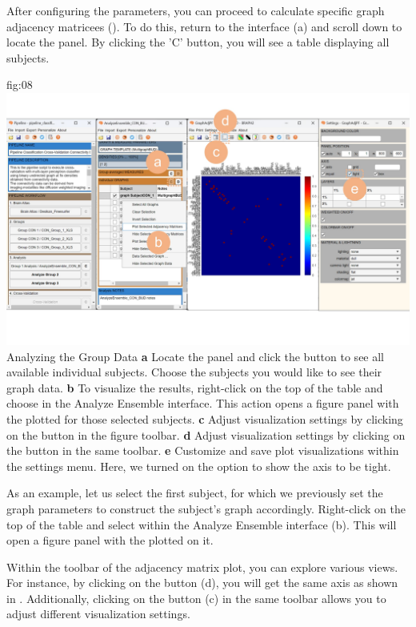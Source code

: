 \documentclass[justified]{tufte-handout}
\begin{document}
{After configuring the parameters, you can proceed to calculate specific graph adjacency matricees (). To do this, return to the  interface (a) and scroll down to locate the  panel. By clicking the 'C' button, you will see a table displaying all subjects.


	{fig:08}
	{
	\includegraphics{fig08.jpg}
	}
	{Analyzing the Group Data}
	{
	{\bf a} Locate the  panel and click the  button to see all available individual subjects. Choose the subjects you would like to see their graph data.
	{\bf b} To visualize the results, right-click on the top of the table and choose  in the Analyze Ensemble interface. This action opens a figure panel with the  plotted for those selected subjects.
	{\bf c} Adjust visualization settings by clicking on the  button in the figure toolbar.
	{\bf d} Adjust visualization settings by clicking on the  button in the same toolbar.
	{\bf e} Customize and save plot visualizations within the settings menu. Here, we turned on the option to show the axis to be tight.
	}

As an example, let us select the first subject, for which we previously set the graph parameters to construct the subject's graph accordingly. 
Right-click on the top of the table and select  within the Analyze Ensemble interface (b). This will open a figure panel with the  plotted on it.

Within the toolbar of the adjacency matrix plot, you can explore various views.
For instance, by clicking on the  button (d), you will get the same axis as shown in . Additionally, clicking on the  button (c) in the same toolbar allows you to adjust different visualization settings.

}
\end{document}
